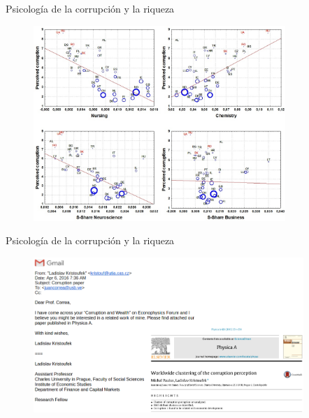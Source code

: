 \documentclass{beamer}
\begin{document}
\begin{frame}{Psicología de la corrupción y la riqueza}
\begin{figure}
\centering
 \includegraphics[width=0.85\textwidth]{F3}
 \end{figure}
\end{frame}

\begin{frame}{Psicología de la corrupción y la riqueza}
\begin{figure}
\centering
 \includegraphics[width=0.91\textwidth]{c3}
 \end{figure}
\end{frame}
\end{document}
